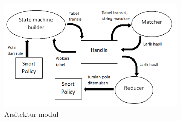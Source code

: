 \begin{figure}[htb]
  \centering
  \includegraphics[width=0.8\textwidth]{resources/module-arch.png}
  \caption[Arsitektur modul]{Arsitektur modul}
  \label{dfd}
\end{figure}